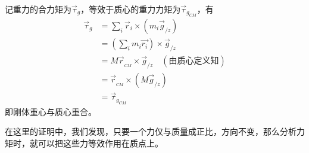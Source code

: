 \newpage
\quad\\
\begin{prove}
	记重力的合力矩为$\vec{\tau}_{g}$，等效于质心的重力力矩为$\vec{\tau}_{g_{CM}}$，有
	\begin{align*}
		\vec{\tau}_g&=\sum_i\vec{r}_i\times(m_i\vec{g}_{/z})\\
		&=(\sum_im_i\vec{r_i})\times\vec{g}_{/z}\\
		&=M\vec{r}_{_{CM}}\times\vec{g}_{/z}\quad(\text{由质心定义知})\\
		&=\vec{r}_{_{CM}}\times(M\vec{g}_{/z})\\
		&=\vec{\tau}_{g_{CM}}
	\end{align*}
	即刚体重心与质心重合。
	
	在这里的证明中，我们发现，只要一个力仅与质量成正比，方向不变，那么分析力矩时，就可以把这些力等效作用在质点上。
\end{prove}
